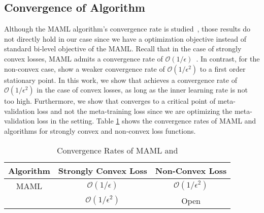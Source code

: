 \subsection{Convergence of \sysname{} Algorithm}
\vspace{-1mm}
Although the MAML algorithm's convergence rate is studied~\citep{balcan2019provable,fallah2020convergence,finn2019online}, those results do not directly hold in our case since we have a \textit{\biopt{}} optimization objective instead of standard bi-level objective of the MAML. Recall that in the case of strongly convex losses, MAML admits a convergence rate of $\mathcal{O}(1/\epsilon)$~\citep{balcan2019provable, finn2019online}. In contrast, for the non-convex case, \cite{fallah2020convergence} show a weaker convergence rate of $\mathcal{O}(1/\epsilon^2)$ to a first order stationary point. In this work, we show that \sysname{} achieves a convergence rate of $\mathcal{O}(1/\epsilon^2)$ in the case of convex losses, as long as the inner learning rate is not too high. Furthermore, we show that \sysname{} converges to a critical point of meta-validation loss and not the meta-training loss since we are optimizing the meta-validation loss in the \biopt{} setting. Table \ref{tab:convergence} shows the convergence rates of MAML and \sysname{} algorithms for strongly convex and non-convex loss functions. 

\begin{table}[htbp]
\small
    \centering
    \begin{tabular}{c|c|c}
         \toprule
         Algorithm &Strongly Convex Loss &Non-Convex Loss\\
         \hline
         MAML &$\mathcal{O}(1/\epsilon)$ &$\mathcal{O}(1/\epsilon^2)$\\ \hline
         \sysname{} & $\mathcal{O}(1/\epsilon^2)$ &Open \\ \bottomrule
    \end{tabular}
    \vspace{-3mm}
    \caption{Convergence Rates of MAML and \sysname{}}
    \label{tab:convergence}
\vspace{-5mm}
\end{table}

